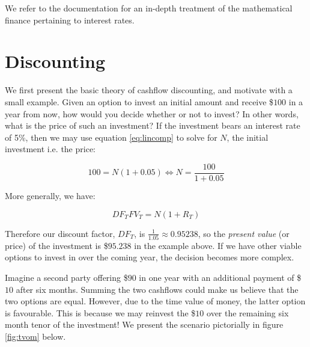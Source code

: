 We refer to the \hql documentation\cite{hqldoc} for an in-depth treatment of the
mathematical finance pertaining to interest rates.

\section{Discounting}\label{sec:discounting}

We first present the basic theory of cashflow discounting, and motivate with
a small example. Given an option to invest an initial amount and receive 
\$$100$ in a year from now, how would you decide whether or not to invest? In
other words, what is the price of such an investment? If the investment bears
an interest rate of 5\%, then we may use equation \ref{eq:lincomp} to solve
for $N$, the initial investment i.e. the price:

\begin{equation}
100 = N (1 + 0.05) \Leftrightarrow N = \frac{100}{1+0.05}
\end{equation}

More generally, we have:

\begin{equation}
DF_T FV_T= N (1 + R_T)
\end{equation}

Therefore our discount factor, $DF_T$, is $\frac{1}{1.05} \approx 0.95238$,
so the \emph{present value} (or price) of the investment is \$$95.238$
in the example above. If we have other viable options to invest in over the coming
year, the decision becomes more complex.

Imagine a second party offering \$$90$ in one year with an additional payment of
\$$10$ after six months. Summing the two cashflows could make us believe that the
two options are equal. However, due to the time value of money, the latter option
is favourable. This is because we may reinvest the \$$10$ over the remaining six
month tenor of the investment! We present the scenario pictorially in figure
\ref{fig:tvom} below.

